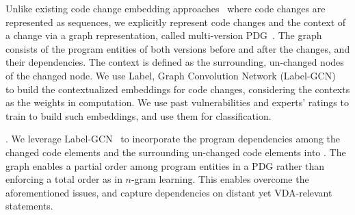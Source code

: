 Unlike existing code change embedding
approaches~\cite{cc2vec,commit2vec} where code changes are represented
as sequences, we explicitly represent code changes and the
context of a change via a graph representation, called multi-version
PDG~\cite{flexeme-fse20}. The graph consists of
the program entities of both versions before and after the changes,
and their dependencies. The context is defined as the surrounding,
un-changed nodes of the changed node.
%
We use Label, Graph Convolution Network (Label-GCN)~\cite{label-gcn}
to build the contextualized embeddings for code changes, considering
the contexts as the weights in computation.
%
We use past vulnerabilities and experts' ratings to train {\tool}
to build such embeddings, and use them for classification.
%



\vspace{1pt}
.
We leverage Label-GCN~\cite{label-gcn} to incorporate the program dependencies among
the changed code elements and the surrounding un-changed code elements into {\tool}.
%
The graph enables a partial order among program entities in a PDG
rather than enforcing a total order as in $n$-gram learning.
%
This enables {\tool} overcome the aforementioned issues, 
and capture
dependencies on distant yet VDA-relevant statements.




